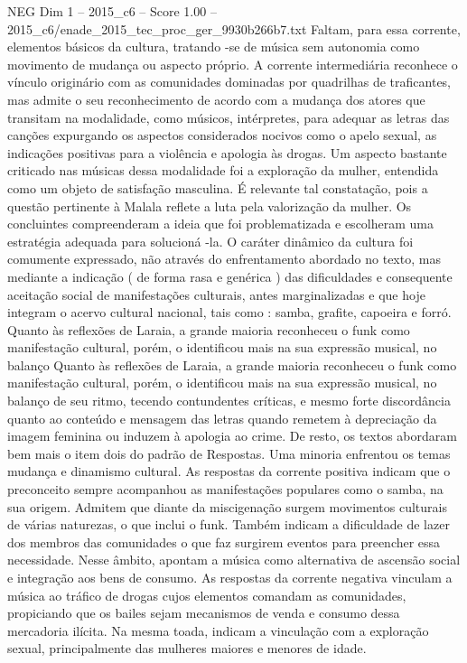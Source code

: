 \begin{textsample}{NEG Dim 1 – 2015\_c6 – Score 1.00 – 2015\_c6/enade\_2015\_tec\_proc\_ger\_9930b266b7.txt}
Faltam, para essa corrente, elementos básicos da cultura, tratando -se de música sem autonomia como movimento de mudança ou aspecto próprio.
A corrente intermediária reconhece o vínculo originário com as comunidades dominadas por quadrilhas de traficantes, mas admite o seu reconhecimento de acordo com a mudança dos atores que transitam na modalidade, como músicos, intérpretes, para adequar as letras das canções expurgando os aspectos considerados nocivos como o apelo sexual, as indicações positivas para a violência e apologia às drogas.
Um aspecto bastante criticado nas músicas dessa modalidade foi a exploração da mulher, entendida como um objeto de satisfação masculina.
É relevante tal constatação, pois a questão pertinente à Malala reflete a luta pela valorização da mulher.
Os concluintes compreenderam a ideia que foi problematizada e escolheram uma estratégia adequada para solucioná -la.
O caráter dinâmico da cultura foi comumente expressado, não através do enfrentamento abordado no texto, mas mediante a indicação ( de forma rasa e genérica ) das dificuldades e consequente aceitação social de manifestações culturais, antes marginalizadas e que hoje integram o acervo cultural nacional, tais como : samba, grafite, capoeira e forró.
Quanto às reflexões de Laraia, a grande maioria reconheceu o funk como manifestação cultural, porém, o identificou mais na sua expressão musical, no balanço Quanto às reflexões de Laraia, a grande maioria reconheceu o funk como manifestação cultural, porém, o identificou mais na sua expressão musical, no balanço de seu ritmo, tecendo contundentes críticas, e mesmo forte discordância quanto ao conteúdo e mensagem das letras quando remetem à depreciação da imagem feminina ou induzem à apologia ao crime.
De resto, os textos abordaram bem mais o item dois do padrão de Respostas.
Uma minoria enfrentou os temas mudança e dinamismo cultural.
As respostas da corrente positiva indicam que o preconceito sempre acompanhou as manifestações populares como o samba, na sua origem.
Admitem que diante da miscigenação surgem movimentos culturais de várias naturezas, o que inclui o funk.
Também indicam a dificuldade de lazer dos membros das comunidades o que faz surgirem eventos para preencher essa necessidade.
Nesse âmbito, apontam a música como alternativa de ascensão social e integração aos bens de consumo.
As respostas da corrente negativa vinculam a música ao tráfico de drogas cujos elementos comandam as comunidades, propiciando que os bailes sejam mecanismos de venda e consumo dessa mercadoria ilícita.
Na mesma toada, indicam a vinculação com a exploração sexual, principalmente das mulheres maiores e menores de idade.

\end{textsample}
